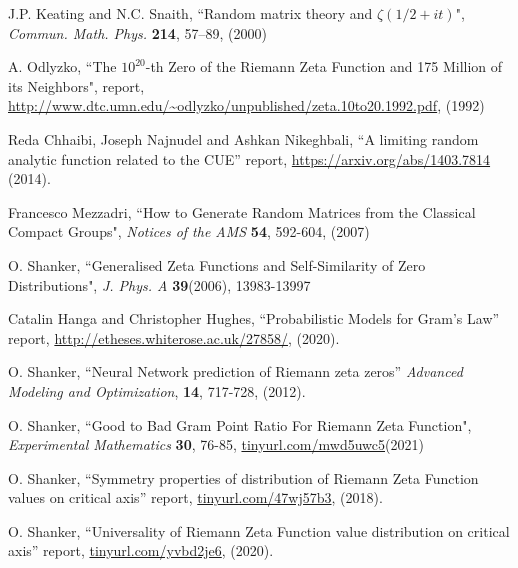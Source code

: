 \documentclass[twoside]{article}
\begin{document}

\begin{thebibliography}{10}

 J.P. Keating and N.C. Snaith, 
``Random matrix theory and $\zeta (1/2+it)$", 
{\it Commun. Math. Phys.} {\bf 214}, 57–89, (2000)

  A. Odlyzko,
``The $10^{20}$-th Zero of the Riemann Zeta
Function and 175 Million of its Neighbors", report,
\url{http://www.dtc.umn.edu/~odlyzko/unpublished/zeta.10to20.1992.pdf}, (1992)

 Reda Chhaibi, Joseph Najnudel and Ashkan Nikeghbali,
``A limiting random analytic function related to the CUE''
report,
\url{https://arxiv.org/abs/1403.7814}
(2014).

Francesco Mezzadri,
``How to Generate Random Matrices from the Classical
Compact Groups", {\it Notices of the AMS} {\bf 54}, 592-604, (2007)

 O. Shanker, 
``Generalised Zeta Functions and Self-Similarity of Zero Distributions",
{\it J.  Phys. A} {\bf39}(2006), 13983-13997

 Catalin Hanga and Christopher Hughes, 
``Probabilistic Models for Gram's Law''
 report,
\url{http://etheses.whiterose.ac.uk/27858/}, 
(2020). 

 O. Shanker, ``Neural Network prediction of Riemann zeta zeros''
{\it Advanced Modeling and Optimization}, {\bf 14}, 717-728, (2012). 

 O. Shanker, 
``Good to Bad Gram Point Ratio For Riemann Zeta Function",
{\it Experimental Mathematics} {\bf 30}, 76-85,
\url{tinyurl.com/mwd5uwc5}(2021)

 O. Shanker, 
``Symmetry properties of distribution of Riemann Zeta Function values on critical axis''
 report,
\url{tinyurl.com/47wj57b3}, 
(2018). 

 O. Shanker, 
``Universality of Riemann Zeta Function value distribution on critical axis''
 report,
\url{tinyurl.com/yvbd2je6}, 
(2020). 




\end{thebibliography} 
\end{document}

